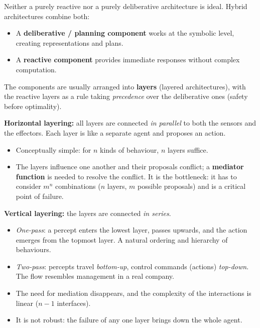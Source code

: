 \documentclass[11pt,a4paper]{article}
\theoremstyle{definition}
\begin{document}
Neither a purely reactive nor a purely deliberative architecture is ideal. Hybrid architectures
combine both:
\begin{itemize}
\item A \textbf{deliberative / planning component} works at the symbolic level, creating
  representations and plans.
\item A \textbf{reactive component} provides immediate responses without complex computation.
\end{itemize}
The components are usually arranged into \textbf{layers} (layered architectures), with the reactive
layers as a rule taking \emph{precedence} over the deliberative ones (safety before optimality).

\begin{defbox}
\textbf{Horizontal layering:} all layers are connected \emph{in parallel} to both the sensors and
the effectors. Each layer is like a separate agent and proposes an action.
\begin{itemize}
\item[$+$] Conceptually simple: for $n$ kinds of behaviour, $n$ layers suffice.
\item[$-$] The layers influence one another and their proposals conflict; a \textbf{mediator
  function} is needed to resolve the conflict. It is the bottleneck: it has to consider $m^n$
  combinations ($n$ layers, $m$ possible proposals) and is a critical point of failure.
\end{itemize}

\textbf{Vertical layering:} the layers are connected \emph{in series}.
\begin{itemize}
\item \emph{One-pass}: a percept enters the lowest layer, passes upwards, and the action emerges from
  the topmost layer. A natural ordering and hierarchy of behaviours.
\item \emph{Two-pass}: percepts travel \emph{bottom-up}, control commands (actions)
  \emph{top-down}. The flow resembles management in a real company.
\item[$+$] The need for mediation disappears, and the complexity of the interactions is linear
  ($n-1$ interfaces).
\item[$-$] It is not robust: the failure of any one layer brings down the whole agent.
\end{itemize}
\end{defbox}
\end{document}
